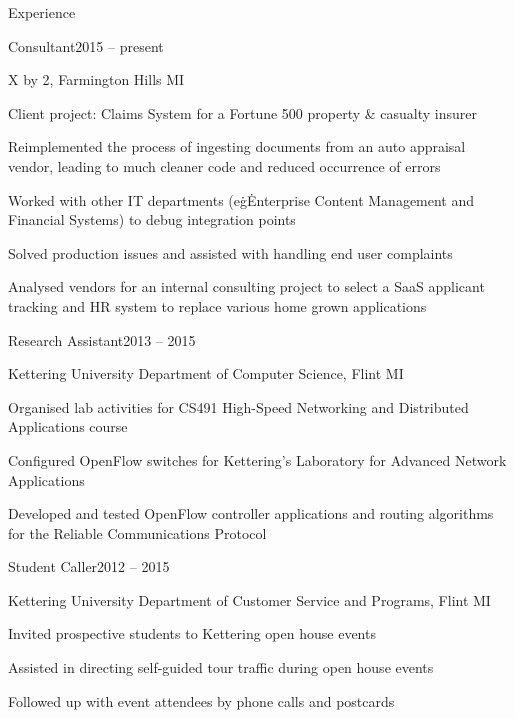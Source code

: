 \documentclass[letterpaper,12pt,oneside,compact]{article}
\begin{document}
\maketitle

\begin{heading}{Experience}
\begin{resitem}{Consultant\hfill 2015 -- present}
\item X by 2, Farmington Hills MI
\item Client project: Claims System for a Fortune 500 property \& casualty insurer
\item Reimplemented the process of ingesting documents from an auto appraisal 
      vendor, leading to much cleaner code and reduced occurrence of errors
\item Worked with other IT departments (e\. g\. Enterprise Content Management 
      and Financial Systems) to debug integration points
\item Solved production issues and assisted with handling end user complaints
\item Analysed vendors for an internal consulting project to select a 
      SaaS applicant tracking and HR system to replace various home grown 
      applications
\end{resitem}
	
	
\begin{resitem}{Research Assistant\hfill 2013 -- 2015}
\item Kettering University Department of Computer Science, Flint MI
\item Organised lab activities for CS491 High-Speed Networking and 
      Distributed Applications course
\item Configured OpenFlow switches for Kettering's Laboratory for Advanced 
      Network Applications
\item Developed and tested OpenFlow controller applications and routing algorithms 
      for the Reliable Communications Protocol
\end{resitem}

\begin{resitem}{Student Caller\hfill 2012 -- 2015}
\item Kettering University Department of Customer Service and Programs, Flint MI
\item Invited prospective students to Kettering open house events
\item Assisted in directing self-guided tour traffic during open house events
\item Followed up with event attendees by phone calls and postcards
\end{resitem}


\end{heading}
\end{document}
